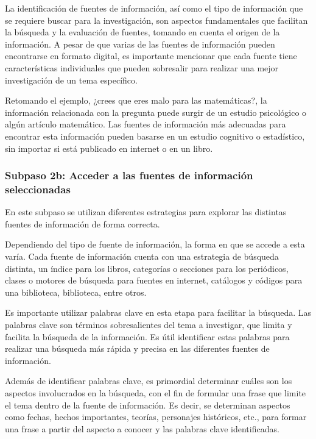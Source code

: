 La identificación de fuentes de información, así como el tipo de información que se requiere buscar para la investigación, son aspectos fundamentales que facilitan la búsqueda y la evaluación de fuentes, tomando en cuenta el origen de la información. A pesar de que varias de las fuentes de información pueden encontrarse en formato digital, es importante mencionar que cada fuente tiene características individuales que pueden sobresalir para realizar una mejor investigación de un tema específico.

Retomando el ejemplo, ¿crees que eres malo para las matemáticas?, la información relacionada con la pregunta puede surgir de un estudio psicológico o algún artículo matemático. Las fuentes de información más adecuadas para encontrar esta información pueden basarse en un estudio cognitivo o estadístico, sin importar si está publicado en internet o en un libro.


\subsubsection{Subpaso 2b: Acceder a las fuentes de información seleccionadas}
\label{secPaso2bCap2}

En este subpaso se utilizan diferentes estrategias para explorar las distintas fuentes de información de forma correcta.

Dependiendo del tipo de fuente de información, la forma en que se accede a esta varía. Cada fuente de información cuenta con una estrategia de búsqueda distinta, un índice para los libros, categorías o secciones para los periódicos, clases o motores de búsqueda para fuentes en internet, catálogos y códigos para una biblioteca, biblioteca, entre otros.

Es importante utilizar palabras clave en esta etapa para facilitar la búsqueda. Las palabras clave son términos sobresalientes del tema a investigar, que limita y facilita la búsqueda de la información. Es útil identificar estas palabras para realizar una búsqueda más rápida y precisa en las diferentes fuentes de información.

Además de identificar palabras clave, es primordial determinar cuáles son los aspectos involucrados en la búsqueda, con el fin de formular una frase que limite el tema dentro de la fuente de información. Es decir, se determinan aspectos como fechas, hechos importantes, teorías, personajes históricos, etc., para formar una frase a partir del aspecto a conocer y las palabras clave identificadas.

